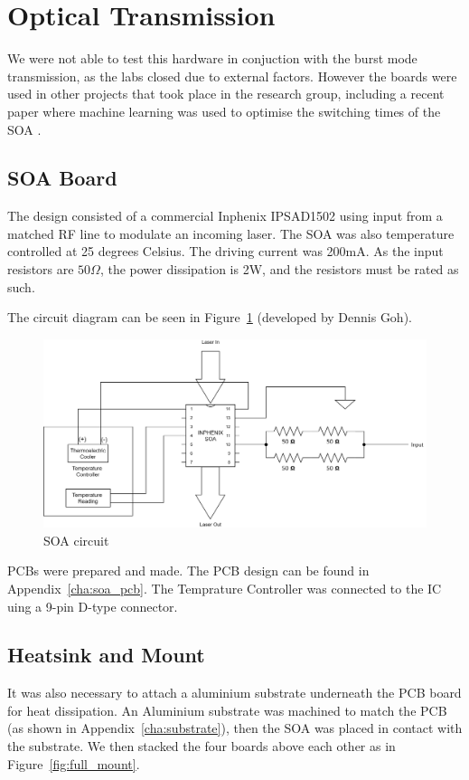 \cleardoublepage
\section{Optical Transmission}%
\label{optical_transmission}
We were not able to test this hardware in conjuction with the burst mode
transmission, as the labs closed due to external factors. However the boards
were used in other projects that took place in the research group, including a
recent paper where machine learning was used to optimise the switching times of
the SOA \cite{gerard2020swift}.

\subsection{SOA Board}%
\label{sub:soa_board}
The design consisted of a commercial Inphenix IPSAD1502 using input from a 
matched RF line to modulate an incoming laser. The SOA was also temperature
controlled at 25 degrees Celsius. 
The driving current was 200mA. As the input resistors are $50\Omega$, the power
dissipation is 2W, and the resistors must be rated as such.

\noindent
The circuit diagram can be seen in Figure~\ref{fig:soa_circuit} (developed by
Dennis Goh).

\begin{figure}[ht]
    \centering
    \hspace*{-1cm}\includegraphics[width=1.3\linewidth]{img/soa_circuit.png}
    \caption{SOA circuit}%
    \label{fig:soa_circuit}
\end{figure}

 PCBs were prepared and made. The PCB design can be found in Appendix~\ref{cha:soa_pcb}.
The Temprature Controller was connected to the IC uing a 9-pin D-type
connector.

\cleardoublepage 
\subsection{Heatsink and Mount}%
\label{sub:heatsink_and_mount}
It was also necessary to attach a aluminium substrate underneath the PCB board
for heat dissipation. An Aluminium substrate was machined to match the PCB (as shown in
Appendix~\ref{cha:substrate}), then the SOA was placed in contact with the
substrate.  We then stacked the four boards above each other as in
Figure~\ref{fig:full_mount}.


